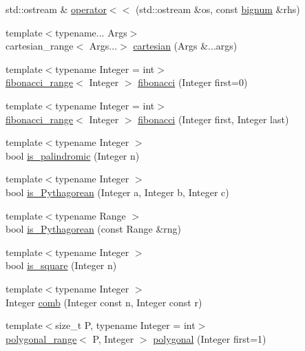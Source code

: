 \begin{DoxyCompactItemize}
\item 
std\-::ostream \& \hyperlink{namespaceyuh_a1fe067954dcd4572b8d2472b8457814d}{operator$<$$<$} (std\-::ostream \&os, const \hyperlink{classyuh_1_1bignum}{bignum} \&rhs)
\item 
{\footnotesize template$<$typename... \-Args$>$ }\\cartesian\-\_\-range$<$ \-Args...$>$ \hyperlink{namespaceyuh_a2bc780cfdd2490f69414d902752eeaa9}{cartesian} (\-Args \&...args)
\item 
{\footnotesize template$<$typename Integer  = int$>$ }\\\hyperlink{classyuh_1_1fibonacci__range}{fibonacci\-\_\-range}$<$ \-Integer $>$ \hyperlink{namespaceyuh_a11988532f81d143e1b5b74d461dd8067}{fibonacci} (\-Integer first=0)
\item 
{\footnotesize template$<$typename Integer  = int$>$ }\\\hyperlink{classyuh_1_1fibonacci__range}{fibonacci\-\_\-range}$<$ \-Integer $>$ \hyperlink{namespaceyuh_a17b1d33879798b95bdefe171df90380a}{fibonacci} (\-Integer first, \-Integer last)
\item 
{\footnotesize template$<$typename Integer $>$ }\\bool \hyperlink{namespaceyuh_afc7f4ca69e0d8cb035be348d77d2a33e}{is\-\_\-palindromic} (\-Integer n)
\item 
{\footnotesize template$<$typename Integer $>$ }\\bool \hyperlink{namespaceyuh_a14298c4b76f1a9d0537e7d5d67cfa784}{is\-\_\-\-Pythagorean} (\-Integer a, \-Integer b, \-Integer c)
\item 
{\footnotesize template$<$typename Range $>$ }\\bool \hyperlink{namespaceyuh_af94deeef5a14f79a6a51c6ca3155d03e}{is\-\_\-\-Pythagorean} (const \-Range \&rng)
\item 
{\footnotesize template$<$typename Integer $>$ }\\bool \hyperlink{namespaceyuh_a43d71ed08fec121213f4ad3acbdc4d26}{is\-\_\-square} (\-Integer n)
\item 
{\footnotesize template$<$typename Integer $>$ }\\\-Integer \hyperlink{namespaceyuh_a275c6c9f73e9d7d9589fea9e2e93aacf}{comb} (\-Integer const n, \-Integer const r)
\item 
{\footnotesize template$<$size\-\_\-t \-P, typename Integer  = int$>$ }\\\hyperlink{classyuh_1_1polygonal__range}{polygonal\-\_\-range}$<$ \-P, \-Integer $>$ \hyperlink{namespaceyuh_ac79b05fba2817ead4f0b5fd4c5a5a805}{polygonal} (\-Integer first=1)

\end{DoxyCompactItemize}
